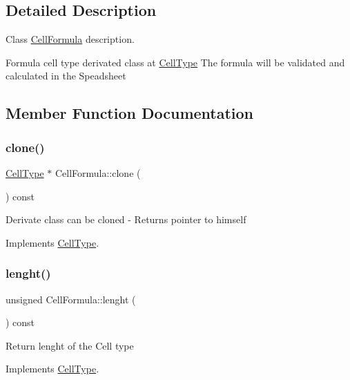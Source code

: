 \subsection{Detailed Description}
Class \hyperlink{class_cell_formula}{Cell\+Formula} description. 

Formula cell type derivated class at \hyperlink{class_cell_type}{Cell\+Type} The formula will be validated and calculated in the Speadsheet 

\subsection{Member Function Documentation}
\mbox{\label{class_cell_formula_a23c26c40ef7056d9395ed8bc4ebef3b9}} 
\subsubsection{\texorpdfstring{clone()}{clone()}}
{\footnotesize\ttfamily \hyperlink{class_cell_type}{Cell\+Type} $\ast$ Cell\+Formula\+::clone (\begin{DoxyParamCaption}{ }\end{DoxyParamCaption}) const\hspace{0.3cm}{\ttfamily [virtual]}}

Derivate class can be cloned -\/ Returns pointer to himself 

Implements \hyperlink{class_cell_type_a8c534b1eed27659429f761fc76d51b89}{Cell\+Type}.

\mbox{\label{class_cell_formula_af188e3f639245c126e0ae30e17b8d3c0}} 
\subsubsection{\texorpdfstring{lenght()}{lenght()}}
{\footnotesize\ttfamily unsigned Cell\+Formula\+::lenght (\begin{DoxyParamCaption}{ }\end{DoxyParamCaption}) const\hspace{0.3cm}{\ttfamily [virtual]}}

Return lenght of the Cell type 

Implements \hyperlink{class_cell_type_a1f8bd268dbd474dd8e08726a6efac066}{Cell\+Type}.

